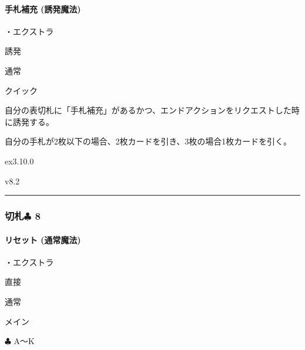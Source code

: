 \documentclass[letterpaper,10pt,dvipdfmx]{sphinxmanual}
\begin{document}
\paragraph{手札補充 (誘発魔法)}
\label{\detokenize{auto/frameActionlist:act-handrefill}}\label{\detokenize{auto/frameActionlist:id78}}
\sphinxAtStartPar
{}

\sphinxAtStartPar
・エクストラ

\sphinxAtStartPar
{} 誘発

\sphinxAtStartPar
{} 通常

\sphinxAtStartPar
{} クイック

\sphinxAtStartPar
{}

\sphinxAtStartPar
自分の表切札に「手札補充」があるかつ、エンドアクションをリクエストした時に誘発する。

\sphinxAtStartPar
{}

\sphinxAtStartPar
自分の手札が2枚以下の場合、2枚カードを引き、3枚の場合1枚カードを引く。

\sphinxAtStartPar
{}  ex3.10.0

\sphinxAtStartPar
{}  v8.2


\bigskip\hrule\bigskip



\subsubsection{切札{\normalsize $\clubsuit$} 8}
\label{\detokenize{auto/frameActionlist:id79}}

\paragraph{リセット (通常魔法)}
\label{\detokenize{auto/frameActionlist:act-reset}}\label{\detokenize{auto/frameActionlist:id80}}
\sphinxAtStartPar
{}

\sphinxAtStartPar
・エクストラ

\sphinxAtStartPar
{} 直接

\sphinxAtStartPar
{} 通常

\sphinxAtStartPar
{} メイン

\sphinxAtStartPar
{} {\normalsize $\clubsuit$} A〜K
\end{document}
